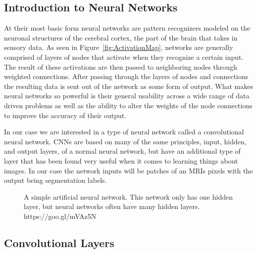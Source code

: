 \documentclass{sig-alternate}
\begin{document}
\subsection{Introduction to Neural Networks}
\label{sec:introNeuralNetworks}

At their most basic form neural networks are pattern recognizers modeled on the neuronal structures of the cerebral cortex, the part of the brain that takes in sensory data. As seen in Figure~\ref{fig:ActivationMap}, networks are generally comprised of layers of nodes that activate when they recognize a certain input. The result of these activations are then passed to neighboring nodes through weighted connections. After passing through the layers of nodes and connections the resulting data is sent out of the network as some form of output. What makes neural networks so powerful is their general usability across a wide range of data driven problems as well as the ability to alter the weights of the node connections to improve the accuracy of their output.

In our case we are interested in a type of neural network called a convolutional neural network. CNNs are based on many of the same principles, input, hidden, and output layers, of a normal neural network, but have an additional type of layer that has been found very useful when it comes to learning things about images. In our case the network inputs will be patches of an MRIs pixels with the output being segmentation labels.

\begin{figure}
\centering
{}
\caption{A simple artificial neural network. This network only has one hidden layer, but neural networks often have many hidden layers. https://goo.gl/mVAz5N}
\label{fig:ANN}
\end{figure}

\subsection{Convolutional Layers}
\label{sec:convolutionalLayers}
\end{document}
